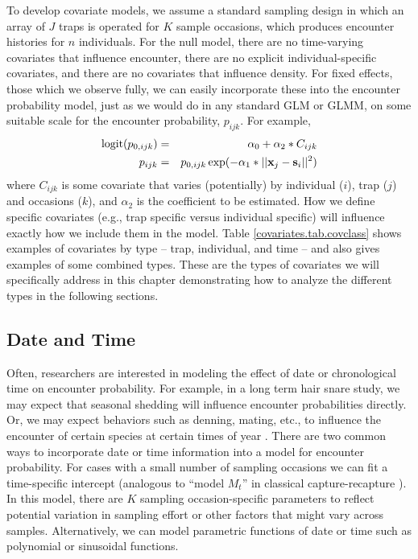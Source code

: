 To develop covariate models, we assume a standard sampling design in which an
array of $J$ traps is operated for $K$ sample occasions, which produces
encounter histories for $n$ individuals.  For the null model, there
are no time-varying covariates that influence encounter, there are no
explicit individual-specific covariates, and there are no covariates
that influence density.  For fixed effects, those which we observe
fully, we can easily incorporate these into the encounter probability
model, just as we would do in any standard GLM or GLMM, on some
suitable scale for the encounter probability, $p_{ijk}$. For example,
\begin{eqnarray*}
\mbox{logit}(p_{0,ijk}) &=& \alpha_0 + \alpha_2*C_{ijk} \\
p_{ijk} &=& p_{0,ijk} \exp(- \alpha_1*||{\bf x}_{j}-{\bf s}_{i}||^2) 
\end{eqnarray*}
where $C_{ijk}$ is some covariate that varies (potentially) by
individual ($i$), trap ($j$) and occasions ($k$), and
$\alpha_2$ is the coefficient to be estimated.
 How we define specific covariates (e.g., trap specific
versus individual specific) will influence exactly how we include them
in the model. Table \ref{covariates.tab.covclass} shows examples of covariates by
type -- trap, individual, and time -- and also gives examples of some combined types.
These are the types of covariates we will specifically address in this chapter demonstrating
how to analyze the different
 types in the following sections.  

\subsection{Date and Time}

Often, researchers are interested in modeling the effect of date or
chronological time on 
encounter probability. For example, in a long term hair snare study,
we may expect that seasonal shedding \citep{wegan_etal:2012} will
influence encounter probabilities directly. Or, we may expect
behaviors such as denning, mating, etc., to influence the encounter of
certain species at certain times of year \citep{kery_etal:2011}.
There are two common ways to incorporate date or time information into
a model for encounter probability. For cases with a small number of
sampling occasions we can fit a time-specific intercept (analogous to
``model $M_{t}$'' in classical capture-recapture
\citep{otis_etal:1978}). In this model, there are $K$ sampling
occasion-specific parameters to reflect potential variation in
sampling effort or other factors that might vary across samples.
Alternatively, we can model parametric functions of date or time such
as polynomial or sinusoidal functions.

